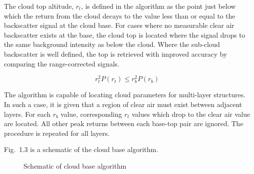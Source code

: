 The cloud top altitude, $r_{t}$, is defined in the algorithm as the point just below 
which the return from the cloud decays to the value less than or 
equal to the backscatter signal at the cloud base. 
For cases where no measurable clear air backscatter exists at the
base, the cloud top is located where the signal drops to the same
background intensity as below the cloud. Where the sub-cloud backscatter is
well defined, the top is retrieved with improved accuracy by comparing
the range-corrected signals.

\begin{equation}
{r_{t}^{2}}{P(r_{t})}{ \leq}{r_{b}^{2}}{P(r_{b})}
\label{rangecorr}
\end{equation} 

The algorithm is capable of locating cloud parameters 
for multi-layer structures. In such a case, it is
given that a region of clear air must exist between  
adjacent layers. For each $r_{b}$ value, 
corresponding $r_{t}$ values which drop to the clear
air value are located. All other peak returns between
each base-top pair are ignored. The procedure is
repeated for all layers.


Fig.~{1.3} is a schematic of the cloud base algorithm.

\begin{figure}
\vspace{5.0in}
\caption{Schematic of cloud base algorithm}
\end{figure}

